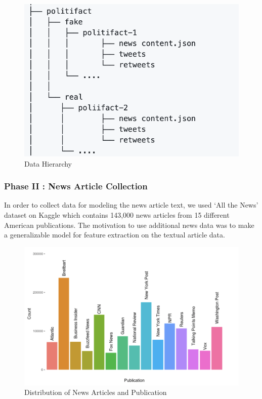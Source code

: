 \documentclass{article}
\begin{document}
\begin{figure}[H]
    \centering
    \includegraphics[scale=0.5]{NeuRIPS2019/fakenews.png}
    \caption{Data Hierarchy}
    \label{Data Hierarchy}
\end{figure}
\subsubsection{Phase II : News Article Collection}
In order to collect data for modeling the news article text, we used ‘All the News’ dataset on Kaggle which contains 143,000 news articles from 15 different American publications. 
The motivation to use additional news data was to make a generalizable model for feature extraction on the textual article data.

\begin{figure}[H]
    \centering
    \includegraphics[scale=0.5]{NeuRIPS2019/all-the-news.png}
    \caption{Distribution of News Articles and Publication}
    \label{Distribution of News Articles and Publication}
\end{figure}
\end{document}
